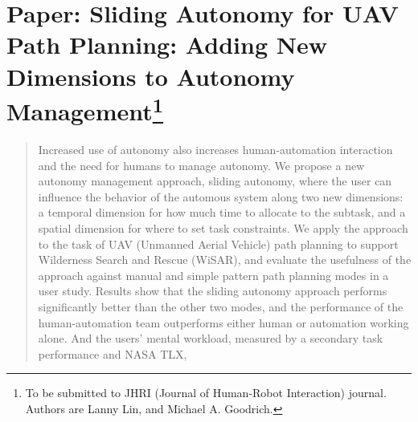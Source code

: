 \chapter[Paper: Sliding Autonomy for UAV Path Planning: Adding New Dimensions to Autonomy Management]{Paper: Sliding Autonomy for UAV Path Planning: Adding New Dimensions to Autonomy Management\footnote {To be submitted to JHRI (Journal of Human-Robot Interaction) journal. Authors are Lanny Lin, and Michael A. Goodrich.}}
\label{chap:JHRI2014}

\begin{abstract}
Increased use of autonomy also increases human-automation interaction and the need for humans to manage autonomy. We propose a new autonomy management approach, sliding autonomy, where the user can influence the behavior of the automous system along two new dimensions: a temporal dimension for how much time to allocate to the subtask, and a spatial dimension for where to set task constraints. We apply the approach to the task of UAV (Unmanned Aerial Vehicle) path planning to support Wilderness Search and Rescue (WiSAR), and evaluate the usefulness of the approach against manual and simple pattern path planning modes in a user study. Results show that the sliding autonomy approach performs significantly better than the other two modes, and the performance of the human-automation team outperforms either human or automation working alone. And the users' mental workload, measured by a secondary task performance and NASA TLX, 
\end{abstract}



